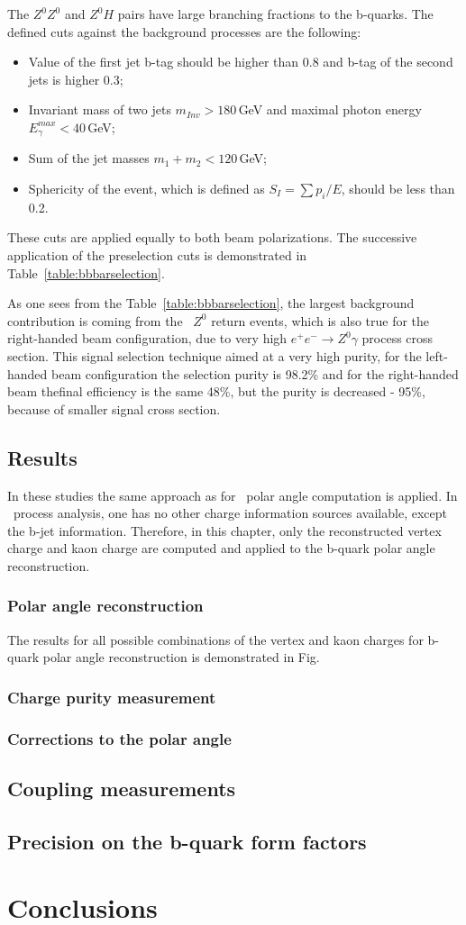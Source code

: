 The $Z^0Z^0$ and $Z^0H$ pairs have large branching fractions to the b-quarks. 
The defined cuts against the background processes are the following:
\begin{itemize}
	\item Value of the first jet b-tag should be higher than 0.8 and b-tag of the second jets is higher 0.3;
	\item Invariant mass of two jets $m_{Inv} > 180$\,GeV and maximal photon energy $E^{max}_\gamma < 40$\,GeV;
	\item Sum of the jet masses $m_1+m_2<120$\,GeV;
	\item Sphericity of the event, which is defined as $S_{I} = \sum p_i / E$, should be less than 0.2.
\end{itemize}
These cuts are applied equally to both beam polarizations.
The successive application of the preselection cuts is demonstrated in Table~\ref{table:bbbarselection}.


As one sees from the Table~\ref{table:bbbarselection}, the largest background contribution is coming from the \bbbar\ $Z^0$ return events, which is also true for the right-handed beam configuration, due to very high $e^+e^-\to Z^0\gamma$ process cross section.
This signal selection technique  aimed at a very high purity, for the left-handed beam configuration the selection purity is 98.2\% and for the right-handed beam thefinal efficiency is the same 48\%, but the purity is decreased - 95\%, because of smaller signal cross section.




\subsection{Results}
\label{sec:BBBarresults}
In these studies the same approach as for \ttbar\ polar angle computation is applied. In \bbbar\ process analysis, one has no other charge information sources available, except the b-jet information. 
Therefore, in this chapter, only the reconstructed vertex charge and kaon charge are computed and applied to the b-quark polar angle reconstruction. 

\subsubsection{Polar angle reconstruction}
The results for all possible combinations of the vertex and kaon charges for b-quark polar angle reconstruction is demonstrated in Fig.~

%
\subsubsection{Charge purity measurement}
\label{sec:ChargePurity}
\subsubsection{Corrections to the polar angle}
\subsection{Coupling measurements}
\subsection{Precision on the b-quark form factors}
\section*{Conclusions}
